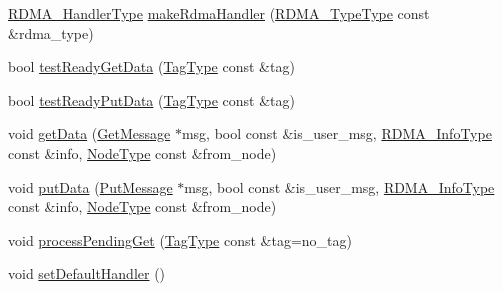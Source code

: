 \begin{DoxyCompactItemize}
\item 
\hyperlink{namespacevt_a9530efb893c0f3846e8ac5f0507e0f49}{R\+D\+M\+A\+\_\+\+Handler\+Type} \hyperlink{structvt_1_1rdma_1_1_state_ab82d3a9820bcee1238ab726ae79eb4e0}{make\+Rdma\+Handler} (\hyperlink{namespacevt_1_1rdma_ac848e1d9da43db6294bd06f83e5d3946}{R\+D\+M\+A\+\_\+\+Type\+Type} const \&rdma\+\_\+type)
\item 
bool \hyperlink{structvt_1_1rdma_1_1_state_aca75303aab9cc0650fd774048e59239e}{test\+Ready\+Get\+Data} (\hyperlink{namespacevt_a84ab281dae04a52a4b243d6bf62d0e52}{Tag\+Type} const \&tag)
\item 
bool \hyperlink{structvt_1_1rdma_1_1_state_a4fc0ac910f62594cc74a82646b9b1d88}{test\+Ready\+Put\+Data} (\hyperlink{namespacevt_a84ab281dae04a52a4b243d6bf62d0e52}{Tag\+Type} const \&tag)
\item 
void \hyperlink{structvt_1_1rdma_1_1_state_aff23d68ef3e0c30c6f2526bb50976148}{get\+Data} (\hyperlink{namespacevt_1_1rdma_acce0da4c9ea1233c3f132c1971943653}{Get\+Message} $\ast$msg, bool const \&is\+\_\+user\+\_\+msg, \hyperlink{structvt_1_1rdma_1_1_state_a6a78216795efe7fb6966c33b1a21d7cf}{R\+D\+M\+A\+\_\+\+Info\+Type} const \&info, \hyperlink{namespacevt_a866da9d0efc19c0a1ce79e9e492f47e2}{Node\+Type} const \&from\+\_\+node)
\item 
void \hyperlink{structvt_1_1rdma_1_1_state_ae18479c7e33e4f99d3c19bf6dc14102d}{put\+Data} (\hyperlink{namespacevt_1_1rdma_ae0a0330c647ec5ac5d508750f4cd4a06}{Put\+Message} $\ast$msg, bool const \&is\+\_\+user\+\_\+msg, \hyperlink{structvt_1_1rdma_1_1_state_a6a78216795efe7fb6966c33b1a21d7cf}{R\+D\+M\+A\+\_\+\+Info\+Type} const \&info, \hyperlink{namespacevt_a866da9d0efc19c0a1ce79e9e492f47e2}{Node\+Type} const \&from\+\_\+node)
\item 
void \hyperlink{structvt_1_1rdma_1_1_state_aa77318390a2d1afd1435d748971daa75}{process\+Pending\+Get} (\hyperlink{namespacevt_a84ab281dae04a52a4b243d6bf62d0e52}{Tag\+Type} const \&tag=no\+\_\+tag)
\item 
void \hyperlink{structvt_1_1rdma_1_1_state_a10c5e2a2694f75e2515667815c236888}{set\+Default\+Handler} ()
\end{DoxyCompactItemize}

